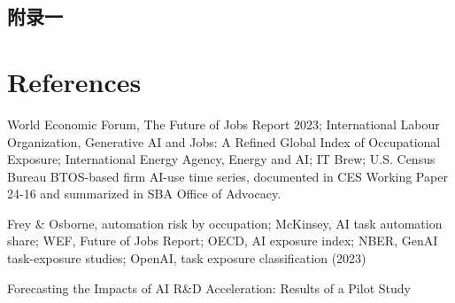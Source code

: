 \documentclass{mcmthesis}
\begin{document}
\begin{appendices}
\section{附录一}




\end{appendices}




\section{References}
\noindent [1]  World Economic Forum, The Future of Jobs Report 2023; International Labour Organization, Generative AI and Jobs: A Refined Global Index of Occupational Exposure; International Energy Agency, Energy and AI; IT Brew; U.S. Census Bureau BTOS-based firm AI-use time series, documented in CES Working Paper 24-16 and summarized in SBA Office of Advocacy.

\noindent [2] Frey \& Osborne, automation risk by occupation; McKinsey, AI task automation share; WEF, Future of Jobs Report; OECD, AI exposure index; NBER, GenAI task-exposure studies; OpenAI, task exposure classification (2023)

\noindent [3] Forecasting the Impacts of AI R\&D Acceleration: Results of a Pilot Study

  
  


\AImatter
\end{document}
